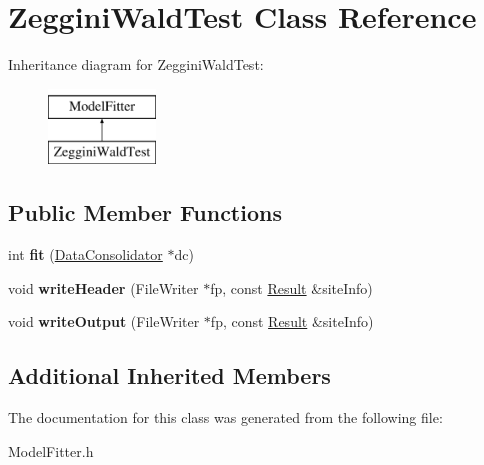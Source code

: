 \hypertarget{classZegginiWaldTest}{\section{Zeggini\-Wald\-Test Class Reference}
\label{classZegginiWaldTest}
}
Inheritance diagram for Zeggini\-Wald\-Test\-:\begin{figure}[H]
\begin{center}
\leavevmode
\includegraphics[height=2.000000cm]{classZegginiWaldTest}
\end{center}
\end{figure}
\subsection*{Public Member Functions}
\begin{DoxyCompactItemize}
\item 
\hypertarget{classZegginiWaldTest_ae91ad9cc600feeff2441223a543d23e1}{int {\bfseries fit} (\hyperlink{classDataConsolidator}{Data\-Consolidator} $\ast$dc)}\label{classZegginiWaldTest_ae91ad9cc600feeff2441223a543d23e1}

\item 
\hypertarget{classZegginiWaldTest_aa69d4617f52b3788b3eea25209d5a5e4}{void {\bfseries write\-Header} (File\-Writer $\ast$fp, const \hyperlink{classResult}{Result} \&site\-Info)}\label{classZegginiWaldTest_aa69d4617f52b3788b3eea25209d5a5e4}

\item 
\hypertarget{classZegginiWaldTest_a09cbc2b0cb9795567f79ae639d61c398}{void {\bfseries write\-Output} (File\-Writer $\ast$fp, const \hyperlink{classResult}{Result} \&site\-Info)}\label{classZegginiWaldTest_a09cbc2b0cb9795567f79ae639d61c398}

\end{DoxyCompactItemize}
\subsection*{Additional Inherited Members}


The documentation for this class was generated from the following file\-:\begin{DoxyCompactItemize}
\item 
Model\-Fitter.\-h\end{DoxyCompactItemize}

